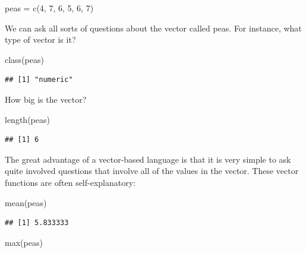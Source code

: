 \documentclass[
]{book}
\newenvironment{Shaded}{\begin{snugshade}}{\end{snugshade}}
\newcommand{\DecValTok}[1]{\textcolor[rgb]{0.00,0.00,0.81}{#1}}
\newcommand{\FunctionTok}[1]{\textcolor[rgb]{0.00,0.00,0.00}{#1}}
\newcommand{\NormalTok}[1]{#1}
\newcommand{\OtherTok}[1]{\textcolor[rgb]{0.56,0.35,0.01}{#1}}
\begin{document}
\begin{Shaded}
\begin{Highlighting}[]
\NormalTok{peas }\OtherTok{=} \FunctionTok{c}\NormalTok{(}\DecValTok{4}\NormalTok{, }\DecValTok{7}\NormalTok{, }\DecValTok{6}\NormalTok{, }\DecValTok{5}\NormalTok{, }\DecValTok{6}\NormalTok{, }\DecValTok{7}\NormalTok{)}
\end{Highlighting}
\end{Shaded}

We can ask all sorts of questions about the vector called peas. For instance, what type of vector is it?

\begin{Shaded}
\begin{Highlighting}[]
\FunctionTok{class}\NormalTok{(peas)}
\end{Highlighting}
\end{Shaded}

\begin{verbatim}
## [1] "numeric"
\end{verbatim}

How big is the vector?

\begin{Shaded}
\begin{Highlighting}[]
\FunctionTok{length}\NormalTok{(peas)}
\end{Highlighting}
\end{Shaded}

\begin{verbatim}
## [1] 6
\end{verbatim}

The great advantage of a vector-based language is that it is very simple to ask quite involved questions that involve all of the values in the vector. These vector functions are often self-explanatory:

\begin{Shaded}
\begin{Highlighting}[]
\FunctionTok{mean}\NormalTok{(peas)}
\end{Highlighting}
\end{Shaded}

\begin{verbatim}
## [1] 5.833333
\end{verbatim}

\begin{Shaded}
\begin{Highlighting}[]
\FunctionTok{max}\NormalTok{(peas)}
\end{Highlighting}
\end{Shaded}
\end{document}
